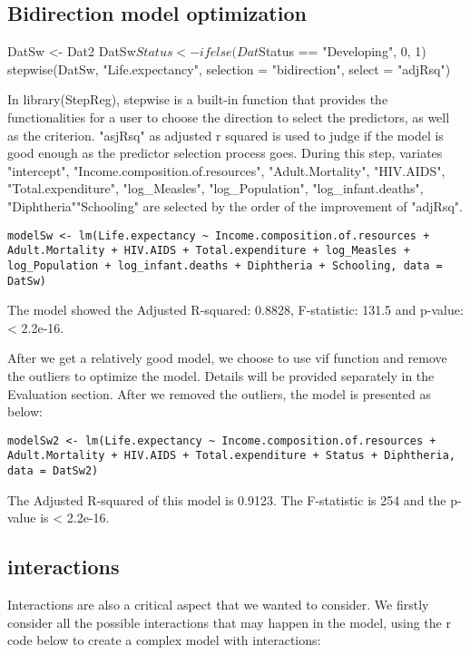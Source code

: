 \subsection{Bidirection model optimization}

DatSw <- Dat2
DatSw$Status <- ifelse(Dat$Status == "Developing", 0, 1)
stepwise(DatSw, "Life.expectancy", selection = "bidirection", select = "adjRsq")

In library(StepReg), stepwise is a built-in function that provides the functionalities for a user to choose the direction to select the predictors, as well as the criterion. "asjRsq" as adjusted r squared is used to judge if the model is good enough as the predictor selection process goes. During this step, variates "intercept", "Income.composition.of.resources", "Adult.Mortality", "HIV.AIDS", "Total.expenditure", "log\_Measles", "log\_Population", "log\_infant.deaths", "Diphtheria""Schooling" are selected by the order of the improvement of "adjRsq".

\begin{verbatim}
modelSw <- lm(Life.expectancy ~ Income.composition.of.resources + Adult.Mortality + HIV.AIDS + Total.expenditure + log_Measles + log_Population + log_infant.deaths + Diphtheria + Schooling, data = DatSw)
\end{verbatim}
The model showed the Adjusted R-squared:  0.8828, F-statistic: 131.5 and p-value: < 2.2e-16.

After we get a relatively good model, we choose to use vif function and remove the outliers to optimize the model. Details will be provided separately in the Evaluation section. After we removed the outliers, the model is presented as below:

\begin{verbatim}
modelSw2 <- lm(Life.expectancy ~ Income.composition.of.resources + Adult.Mortality + HIV.AIDS + Total.expenditure + Status + Diphtheria, data = DatSw2)
\end{verbatim}
The Adjusted R-squared of this model is 0.9123. The F-statistic is 254 and the p-value is < 2.2e-16. 

\subsection{interactions}

Interactions are also a critical aspect that we wanted to consider. We firstly consider all the possible interactions that may happen in the model, using the r code below to create a complex model with interactions:

